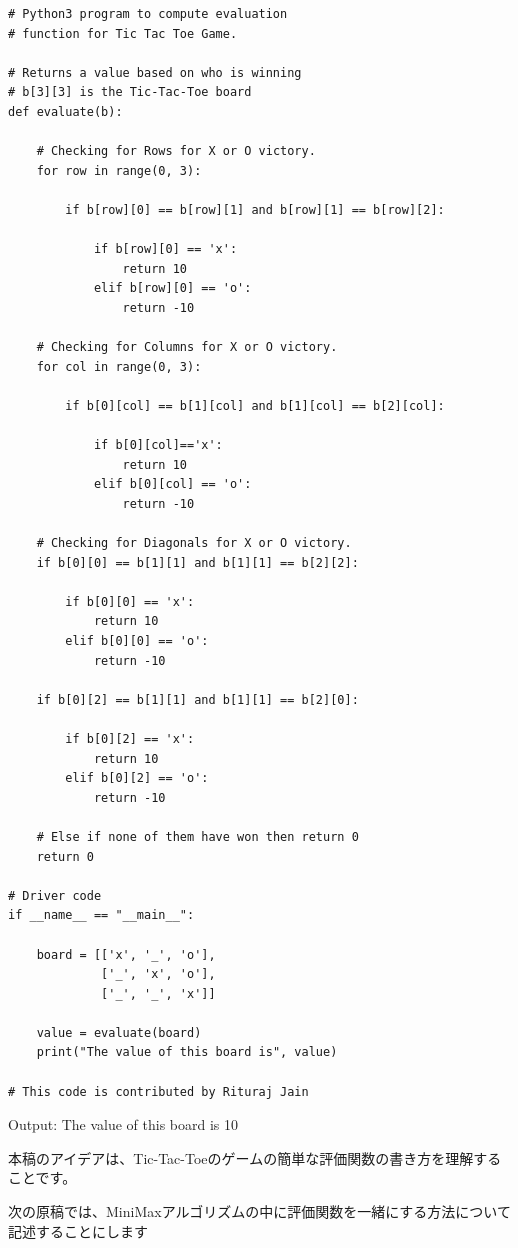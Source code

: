 \documentclass[uplatex,a4paper,11pt,oneside,openany]{jsbook}
\begin{document}
\begin{lstlisting}[caption=minimax001,label=prog001-2]
# Python3 program to compute evaluation
# function for Tic Tac Toe Game.

# Returns a value based on who is winning
# b[3][3] is the Tic-Tac-Toe board
def evaluate(b):

    # Checking for Rows for X or O victory.
    for row in range(0, 3):

        if b[row][0] == b[row][1] and b[row][1] == b[row][2]:

            if b[row][0] == 'x':
                return 10
            elif b[row][0] == 'o':
                return -10

    # Checking for Columns for X or O victory.
    for col in range(0, 3):

        if b[0][col] == b[1][col] and b[1][col] == b[2][col]:

            if b[0][col]=='x':
                return 10
            elif b[0][col] == 'o':
                return -10

    # Checking for Diagonals for X or O victory.
    if b[0][0] == b[1][1] and b[1][1] == b[2][2]:

        if b[0][0] == 'x':
            return 10
        elif b[0][0] == 'o':
            return -10

    if b[0][2] == b[1][1] and b[1][1] == b[2][0]:

        if b[0][2] == 'x':
            return 10
        elif b[0][2] == 'o':
            return -10

    # Else if none of them have won then return 0
    return 0

# Driver code
if __name__ == "__main__":

    board = [['x', '_', 'o'],
             ['_', 'x', 'o'],
             ['_', '_', 'x']]

    value = evaluate(board)
    print("The value of this board is", value)

# This code is contributed by Rituraj Jain
\end{lstlisting}

\begin{itembox}[l]{Output:}
The value of this board is 10
\end{itembox}

本稿のアイデアは、Tic-Tac-Toeのゲームの簡単な評価関数の書き方を理解することです。

次の原稿では、MiniMaxアルゴリズムの中に評価関数を一緒にする方法について記述することにします
\end{document}
